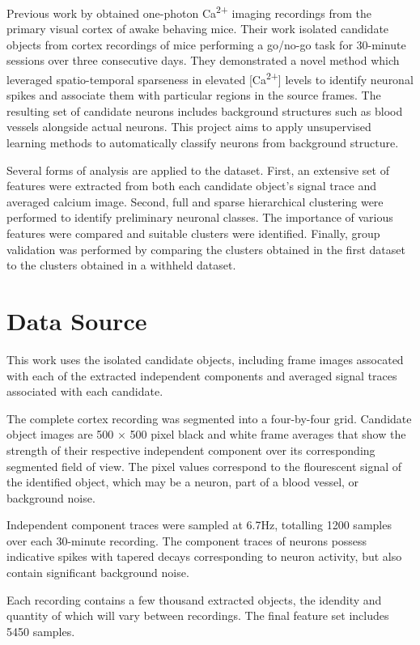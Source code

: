 \documentclass[10pt]{article}
\newcommand{\calcium}[0]{Ca\textsuperscript{2+}}
\begin{document}
Previous work by \citeauthor{Mukamel2009} obtained one-photon {\calcium} imaging recordings from the primary visual cortex of awake behaving mice.
Their work isolated candidate objects from cortex recordings of mice performing a go/no-go task for \num{30}-minute sessions over three consecutive days.
They demonstrated a novel method which leveraged spatio-temporal sparseness in elevated [\calcium] levels to identify neuronal spikes and associate them with particular regions in the source frames.
The resulting set of candidate neurons includes background structures such as blood vessels alongside actual neurons.
This project aims to apply unsupervised learning methods to automatically classify neurons from background structure.

Several forms of analysis are applied to the dataset.
First, an extensive set of features were extracted from both each candidate object's signal trace and averaged calcium image.
Second, full and sparse hierarchical clustering were performed to identify preliminary neuronal classes.
The importance of various features were compared and suitable clusters were identified.
Finally, group validation was performed by comparing the clusters obtained in the first dataset to the clusters obtained in a withheld dataset.

\section{Data Source}


This work uses the isolated candidate objects, including frame images assocated with each of the extracted independent components and averaged signal traces associated with each candidate.

The complete cortex recording was segmented into a four-by-four grid.
Candidate object images are \num{500} $\times$ \num{500} pixel black and white frame averages that show the strength of their respective independent component over its corresponding segmented field of view. 
The pixel values correspond to the flourescent signal of the identified object, which may be a neuron, part of a blood vessel, or background noise.

Independent component traces were sampled at \num{6.7}\si{Hz}, totalling \num{1200} samples over each \num{30}-minute recording. The component traces of neurons possess indicative spikes with tapered decays corresponding to neuron activity, but also contain significant background noise.

Each recording contains a few thousand extracted objects, the idendity and quantity of which will vary between recordings.
The final feature set includes \num{5450} samples.
\end{document}
